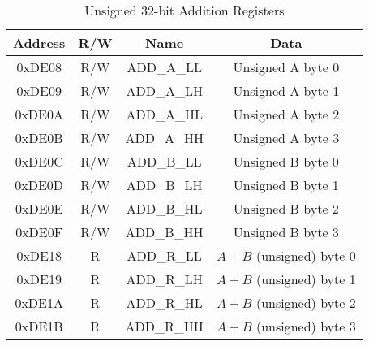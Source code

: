 \begin{table}[ht]
    \begin{center}
        \begin{tabular}{|c|c|c|c|} \hline
            Address & R/W & Name & Data \\\hline\hline
            0xDE08 & R/W & ADD\_A\_LL & Unsigned A byte 0 \\\hline
            0xDE09 & R/W & ADD\_A\_LH & Unsigned A byte 1 \\\hline
            0xDE0A & R/W & ADD\_A\_HL & Unsigned A byte 2 \\\hline
            0xDE0B & R/W & ADD\_A\_HH & Unsigned A byte 3 \\\hline
            0xDE0C & R/W & ADD\_B\_LL & Unsigned B byte 0 \\\hline
            0xDE0D & R/W & ADD\_B\_LH & Unsigned B byte 1 \\\hline
            0xDE0E & R/W & ADD\_B\_HL & Unsigned B byte 2 \\\hline
            0xDE0F & R/W & ADD\_B\_HH & Unsigned B byte 3 \\\hline
            0xDE18 & R   & ADD\_R\_LL & $A + B$ (unsigned) byte 0 \\\hline
            0xDE19 & R   & ADD\_R\_LH & $A + B$ (unsigned) byte 1 \\\hline
            0xDE1A & R   & ADD\_R\_HL & $A + B$ (unsigned) byte 2 \\\hline
            0xDE1B & R   & ADD\_R\_HH & $A + B$ (unsigned) byte 3 \\\hline
        \end{tabular}
    \end{center}
    \caption{Unsigned 32-bit Addition Registers}
    \label{tab:math_add_reg}
\end{table}
